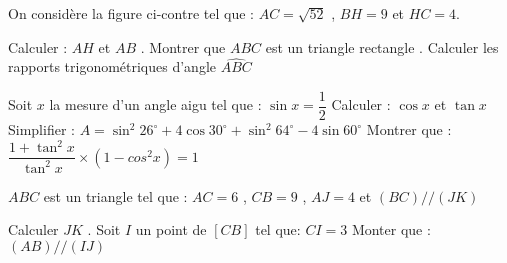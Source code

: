 \documentclass[a4paper,addpoints,12pt]{exam}
\begin{document}
\begin{exo}
\begin{minipage}{0.6\linewidth}
 On considère la figure ci-contre tel que : $AC=\sqrt{52}$ , $BH=9$ et $HC=4$.
\begin{questions}
\question Calculer : $AH$ et $AB$ .
\question Montrer que $ABC$ est un triangle rectangle .
\question Calculer les rapports trigonométriques d'angle $\widehat{ABC}$

Soit $x$ la mesure d'un angle aigu tel que : $\sin x =\dfrac{1}{2}$
\question Calculer : $\cos x$ et $\tan x$
\question Simplifier  :
$A = \sin^{2}26^{\circ} +4\cos30^{\circ} +\sin^{2}64^{\circ}-4\sin60^{\circ} $
\question Montrer que : $\dfrac{1+\tan^{2}x}{\tan^{2}x}\times (1-cos^{2}x)=1$
\end{questions}
\end{minipage}
\begin{minipage}{0.4\linewidth}
\end{minipage}
\end{exo}

\begin{exo}
\begin{minipage}{0.5\linewidth}
$ABC$ est un triangle tel que : $AC=6$ , $CB=9$ , $AJ=4$  et $(BC)//(JK)$
\begin{questions}
\question Calculer  $JK$ .
\question Soit $I$ un point de $[CB] $ tel que: $CI=3$\newline
Monter que : $(AB)//(IJ)$
\end{questions}
\end{minipage}
\begin{minipage}{0.5\linewidth}
\end{minipage}
\end{exo}
\end{document}
